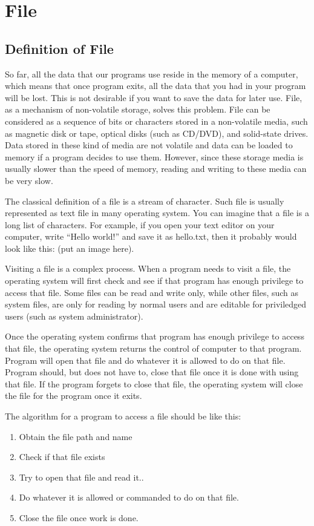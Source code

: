\documentclass[../main.tex]{subfiles}
\begin{document}
\section{File}
\subsection{Definition of File}
So far, all the data that our programs use reside in the memory of a computer,
which means that once program exits, all the data that you had in your program
will be lost. This is not desirable if you want to save the data for later use.
File, as a mechanism of non-volatile storage, solves this problem. File can be
considered as a sequence of bits or characters stored in a non-volatile media,
such as magnetic disk or tape, optical disks (such as CD/DVD), and solid-state
drives. Data stored in these kind of media are not volatile and data can be
loaded to memory if a program decides to use them. However, since these storage
media is usually slower than the speed of memory, reading and writing to these
media can be very slow.

The classical definition of a file is a stream of character. Such file is
usually represented as text file in many operating system. You can imagine that
a file is a long list of characters. For example, if you open your text editor
on your computer, write ``Hello world!'' and save it as hello.txt, then it
probably would look like this: (put an image here).

Visiting a file is a complex process. When a program needs to visit a file, the
operating system will first check and see if that program has enough privilege to
access that file. Some files can be read and write only, while other files, such
as system files, are only for reading by normal users and are editable for
priviledged users (such as system administrator).

Once the operating system confirms that program has enough privilege to access
that file, the operating system returns the control of computer to that program.
Program will open that file and do whatever it is allowed to do on that file.
Program should, but does not have to, close that file once it is done with using
that file. If the program forgets to close that file, the operating system will
close the file for the program once it exits.

The algorithm for a program to access a file should be like this:
\begin{enumerate}
    \item Obtain the file path and name
    \item Check if that file exists
    \item Try to open that file and read it..
    \item Do whatever it is allowed or commanded to do on that file.
    \item Close the file once work is done.
\end{enumerate}
\end{document}
